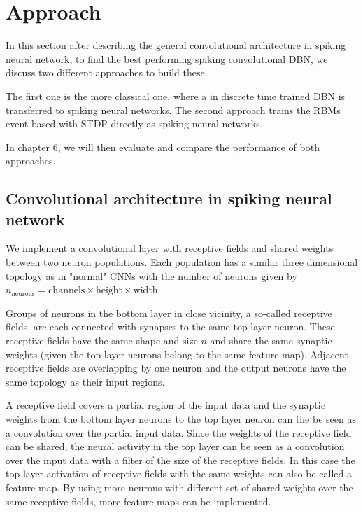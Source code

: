 \chapter{Approach}

In this section after describing the general convolutional architecture in spiking neural network, to find the best performing spiking convolutional DBN, we discuss two different approaches to build these.

The first one is the more classical one, where a in discrete time trained DBN is transferred to spiking neural networks.
The second approach trains the RBMs event based with STDP directly as spiking neural networks. 

In chapter 6, we will then evaluate and compare the performance of both approaches.

\section{Convolutional architecture in spiking neural network}

We implement a convolutional layer with receptive fields and shared weights between two neuron populations. 
Each population has a similar three dimensional topology as in "normal" CNNs with the number of neurons given by $n_{ \text{neurons}} = \text{channels} \times \text{height} \times \text{width}$.

Groups of neurons in the bottom layer in close vicinity, a so-called receptive fields, are each connected with synapses to the same top layer neuron.
These receptive fields have the same shape and size $n$ and share the same synaptic weights (given the top layer neurons belong to the same feature map).
Adjacent receptive fields are overlapping by one neuron and the output neurons have the same topology as their input regions. 

A receptive field covers a partial region of the input data and the synaptic weights from the bottom layer neurons to the top layer neuron can the be seen as a convolution over the partial input data.
Since the weights of the receptive field can be shared, the neural activity in the top layer can be seen as a convolution over the input data with a filter of the size of the receptive fields.
In this case the top layer activation of receptive fields with the same weights can also be called a feature map.
By using more neurons with different set of shared weights over the same receptive fields, more feature maps can be implemented.     

